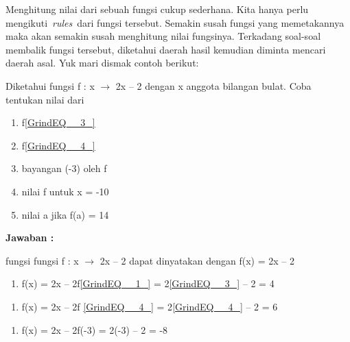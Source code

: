 \documentclass[11pt,fleqn]{book} %
\begin{document}
\begin{myEnumerate}
\begin{itemize}
\noindent 

\noindent Menghitung nilai dari sebuah fungsi cukup sederhana. Kita hanya perlu mengikuti~\textit{rules}~dari fungsi tersebut. Semakin susah fungsi yang memetakannya maka akan semakin susah menghitung nilai fungsinya. Terkadang soal-soal membalik fungsi tersebut, diketahui daerah hasil kemudian diminta mencari daerah asal. Yuk mari dismak contoh berikut:

\noindent 

\noindent Diketahui fungsi f : x $\mathrm{\to}$ 2x -- 2 dengan x anggota bilangan bulat. Coba tentukan nilai dari

\noindent 

\begin{enumerate}
\item  f\eqref{GrindEQ__3_}

\item  f\eqref{GrindEQ__4_}

\item  bayangan (-3) oleh f

\item  nilai f untuk x = -10

\item  nilai a jika f(a) = 14
\end{enumerate}

\noindent 

\noindent \textbf{Jawaban :}

\noindent fungsi fungsi f : x $\mathrm{\to}$ 2x -- 2 dapat dinyatakan dengan f(x) = 2x -- 2

\noindent 

\begin{enumerate}
\item  f(x) = 2x -- 2f\eqref{GrindEQ__1_} = 2\eqref{GrindEQ__3_} -- 2 = 4
\end{enumerate}

\noindent 

\begin{enumerate}
\item  f(x) = 2x -- 2f \eqref{GrindEQ__4_} = 2\eqref{GrindEQ__4_} -- 2 = 6
\end{enumerate}

\noindent 

\begin{enumerate}
\item  f(x) = 2x -- 2f(-3) = 2(-3) -- 2 = -8
\end{enumerate}

\noindent 


\end{itemize}
\end{myEnumerate}
\end{document}
